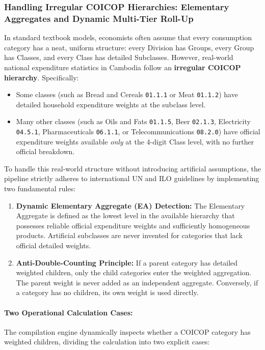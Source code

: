 \subsubsection{Handling Irregular COICOP Hierarchies: Elementary Aggregates and Dynamic Multi-Tier Roll-Up}
\hs In standard textbook models, economists often assume that every consumption category has a neat, uniform structure: every Division has Groups, every Group has Classes, and every Class has detailed Subclasses. However, real-world national expenditure statistics in Cambodia follow an \textbf{irregular COICOP hierarchy}. Specifically:
\begin{itemize}
    \item Some classes (such as Bread and Cereals \texttt{01.1.1} or Meat \texttt{01.1.2}) have detailed household expenditure weights at the subclass level.
    \item Many other classes (such as Oils and Fats \texttt{01.1.5}, Beer \texttt{02.1.3}, Electricity \texttt{04.5.1}, Pharmaceuticals \texttt{06.1.1}, or Telecommunications \texttt{08.2.0}) have official expenditure weights available \textit{only} at the 4-digit Class level, with no further official breakdown.
\end{itemize}

\hs To handle this real-world structure without introducing artificial assumptions, the pipeline strictly adheres to international UN and ILO guidelines \citep{imf2020cpi} by implementing two fundamental rules:
\begin{enumerate}
    \item \textbf{Dynamic Elementary Aggregate (EA) Detection:} The Elementary Aggregate is defined as the lowest level in the available hierarchy that possesses reliable official expenditure weights and sufficiently homogeneous products. Artificial subclasses are never invented for categories that lack official detailed weights.
    \item \textbf{Anti-Double-Counting Principle:} If a parent category has detailed weighted children, only the child categories enter the weighted aggregation. The parent weight is never added as an independent aggregate. Conversely, if a category has no children, its own weight is used directly.
\end{enumerate}

\paragraph{Two Operational Calculation Cases:}
The compilation engine dynamically inspects whether a COICOP category has weighted children, dividing the calculation into two explicit cases:

